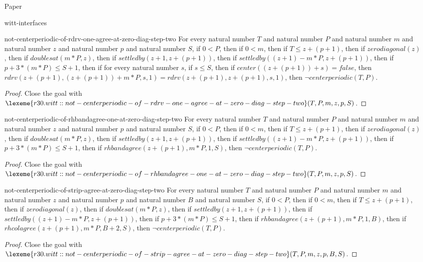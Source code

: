\begin{lexlean}{Paper}
\begin{section}{witt-interfaces}
  \begin{theorem}{not-centerperiodic-of-rdrv-one-agree-at-zero-diag-step-two}
  For every natural number \(T\) and natural number \(P\) and natural number \(m\) and natural number \(z\) and natural number \(p\) and natural number \(S\), if \(0 < P\), then if \(0 < m\), then if \(T ≤ z + (p + 1)\), then if \(zerodiagonal(z)\), then if \(doublesat(m * P, z)\), then if \(settledby(z + 1, z + (p + 1))\), then if \(settledby((z + 1) - m * P, z + (p + 1))\), then if \(p + 3 * (m * P) ≤ S + 1\), then if for every natural number \(s\), if \(s ≤ S\), then if \(center((z + (p + 1)) + s) = false\), then \(rdrv(z + (p + 1), (z + (p + 1)) + m * P, s, 1) = rdrv(z + (p + 1), z + (p + 1), s, 1)\), then \(¬ centerperiodic(T, P)\).
  \begin{proof}
  Close the goal with \(\lexeme{r30.witt::not-centerperiodic-of-rdrv-one-agree-at-zero-diag-step-two}(T, P, m, z, p, S)\).
  \end{proof}
  \end{theorem}

  \begin{theorem}{not-centerperiodic-of-rhbandagree-one-at-zero-diag-step-two}
  For every natural number \(T\) and natural number \(P\) and natural number \(m\) and natural number \(z\) and natural number \(p\) and natural number \(S\), if \(0 < P\), then if \(0 < m\), then if \(T ≤ z + (p + 1)\), then if \(zerodiagonal(z)\), then if \(doublesat(m * P, z)\), then if \(settledby(z + 1, z + (p + 1))\), then if \(settledby((z + 1) - m * P, z + (p + 1))\), then if \(p + 3 * (m * P) ≤ S + 1\), then if \(rhbandagree(z + (p + 1), m * P, 1, S)\), then \(¬ centerperiodic(T, P)\).
  \begin{proof}
  Close the goal with \(\lexeme{r30.witt::not-centerperiodic-of-rhbandagree-one-at-zero-diag-step-two}(T, P, m, z, p, S)\).
  \end{proof}
  \end{theorem}

  \begin{theorem}{not-centerperiodic-of-strip-agree-at-zero-diag-step-two}
  For every natural number \(T\) and natural number \(P\) and natural number \(m\) and natural number \(z\) and natural number \(p\) and natural number \(B\) and natural number \(S\), if \(0 < P\), then if \(0 < m\), then if \(T ≤ z + (p + 1)\), then if \(zerodiagonal(z)\), then if \(doublesat(m * P, z)\), then if \(settledby(z + 1, z + (p + 1))\), then if \(settledby((z + 1) - m * P, z + (p + 1))\), then if \(p + 3 * (m * P) ≤ S + 1\), then if \(rhbandagree(z + (p + 1), m * P, 1, B)\), then if \(rhcolagree(z + (p + 1), m * P, B + 2, S)\), then \(¬ centerperiodic(T, P)\).
  \begin{proof}
  Close the goal with \(\lexeme{r30.witt::not-centerperiodic-of-strip-agree-at-zero-diag-step-two}(T, P, m, z, p, B, S)\).
  \end{proof}
  \end{theorem}


\end{section}
\end{lexlean}
